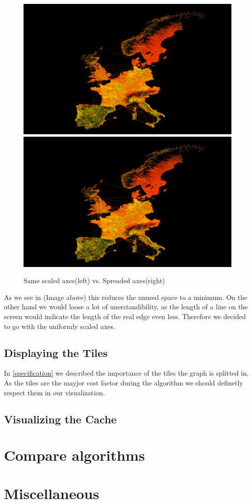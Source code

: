 \documentclass
[
	paper = a4,
    pagesize,
	12 pt,
	oneside,                       %
    open = right,
	DIV = calc,
	BCOR = 0 mm,                   %
	bibtotoc
]
{scrbook}
\begin{document}
\begin{figure}[h!]
	\includegraphics[width=.5\textwidth]{Images/placeholder.png}
	\includegraphics[width=.5\textwidth]{Images/placeholder.png}
\caption[]{Same scaled axes(left) vs. Spreaded axes(right)}
\label{fig:projections}
\end{figure}

As we see in (Image above) this reduces the unused space to a minimum. On the other hand we would loose a lot of unerstandibility, as the length of a line on the screen would indicate the length of the real edge even less.
Therefore we decided to go with the uniformly scaled axes.


\subsection{Displaying the Tiles}

In \ref{specification} we described the importance of the tiles the graph is splitted in. As the tiles are the mayjor cost factor during the algorithm we should definetly respect them in our visualization.


\subsection{Visualizing the Cache}


\section{Compare algorithms}


\section{Miscellaneous}
\end{document}
